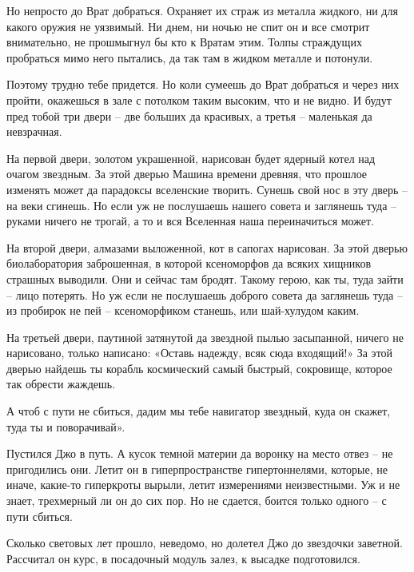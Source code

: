 \documentclass[ebook,oneside,final,openright]{memoir}
\begin{document}
\par
Но непросто до Врат добраться. Охраняет их страж из металла жидкого, ни для какого оружия не уязвимый. Ни днем, ни ночью не спит он и все смотрит внимательно, не прошмыгнул бы кто к Вратам этим. Толпы страждущих пробраться мимо него пытались, да так там в жидком металле и потонули.\par
\par
Поэтому трудно тебе придется. Но коли сумеешь до Врат добраться и через них пройти, окажешься в зале с потолком таким высоким, что и не видно. И будут пред тобой три двери – две больших да красивых, а третья – маленькая да невзрачная.\par
\par
На первой двери, золотом украшенной, нарисован будет ядерный котел над очагом звездным. За этой дверью Машина времени древняя, что прошлое изменять может да парадоксы вселенские творить. Сунешь свой нос в эту дверь – на веки сгинешь. Но если уж не послушаешь нашего совета и заглянешь туда – руками ничего не трогай, а то и вся Вселенная наша переиначиться может.\par
\par
На второй двери, алмазами выложенной, кот в сапогах нарисован. За этой дверью биолаборатория заброшенная, в которой ксеноморфов да всяких хищников страшных выводили. Они и сейчас там бродят. Такому герою, как ты, туда зайти – лицо потерять. Но уж если не послушаешь доброго совета да заглянешь туда – из пробирок не пей – ксеноморфиком станешь, или шай-хулудом каким.\par
\par
На третьей двери, паутиной затянутой да звездной пылью засыпанной, ничего не нарисовано, только написано: «Оставь надежду, всяк сюда входящий!» За этой дверью найдешь ты корабль космический самый быстрый, сокровище, которое так обрести жаждешь.\par
\par
А чтоб с пути не сбиться, дадим мы тебе навигатор звездный, куда он скажет, туда ты и поворачивай».\par
\par
Пустился Джо в путь. А кусок темной материи да воронку на место отвез – не пригодились они. Летит он в гиперпространстве гипертоннелями, которые, не иначе, какие-то гиперкроты вырыли, летит измерениями неизвестными. Уж и не знает, трехмерный ли он до сих пор. Но не сдается, боится только одного – с пути сбиться.\par
\par
Сколько световых лет прошло, неведомо, но долетел Джо до звездочки заветной. Рассчитал он курс, в посадочный модуль залез, к высадке подготовился.\par
\end{document}
